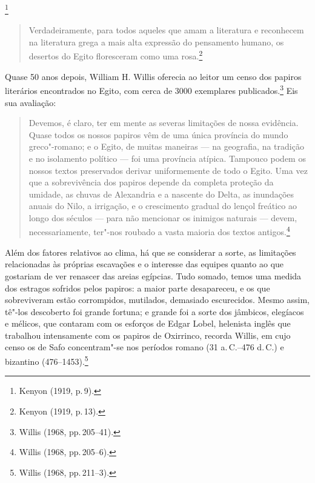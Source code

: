 \footnote{ Kenyon (1919, p.\,9).}  

\begin{quote}
Verdadeiramente, para todos aqueles que amam a literatura e reconhecem
na literatura grega a mais alta expressão do pensamento humano, os desertos do
Egito floresceram como uma rosa.\footnote{ Kenyon (1919, p.\,13).}
\end{quote}


Quase 50 anos depois, William H. Willis oferecia ao
leitor um censo dos papiros literários encontrados no Egito, com cerca de 3000
exemplares publicados.\footnote{ Willis (1968, pp.\,205--41).} Eis sua avaliação: 

\begin{quote}
Devemos, é claro, ter em mente as severas limitações de nossa evidência. Quase
todos os nossos papiros vêm de uma única província do mundo greco"-romano; e o
Egito, de muitas maneiras --- na geografia, na tradição e no isolamento político
--- foi uma província atípica. Tampouco podem os nossos textos preservados
derivar uniformemente de todo o Egito. Uma vez que a sobrevivência dos papiros
depende da completa proteção da umidade, as chuvas de Alexandria e a nascente
do Delta, as inundações anuais do Nilo, a irrigação, e o crescimento gradual do
lençol freático ao longo dos séculos --- para não mencionar os inimigos naturais
--- devem, necessariamente, ter"-nos roubado a vasta maioria dos textos antigos.\footnote{ Willis (1968, pp.\,205--6).}
\end{quote}

Além dos fatores relativos ao clima, há que se considerar a sorte, as limitações
relacionadas às próprias escavações e o interesse das equipes quanto ao que
gostariam de ver renascer das areias egípcias. Tudo somado, temos uma medida
dos estragos sofridos pelos papiros: a maior parte desapareceu, e os que
sobreviveram estão corrompidos, mutilados, demasiado escurecidos. Mesmo assim,
tê"-los descoberto foi grande fortuna; e grande foi a sorte dos jâmbicos,
elegíacos e mélicos, que contaram com os esforços de Edgar Lobel, helenista
inglês que trabalhou intensamente com os papiros de Oxirrinco, recorda Willis,
em cujo censo os de Safo concentram"-se nos períodos
romano (31 a.\,C.--476 d.\,C.) e bizantino (476--1453).\footnote{ Willis (1968, pp.\,211--3).}

